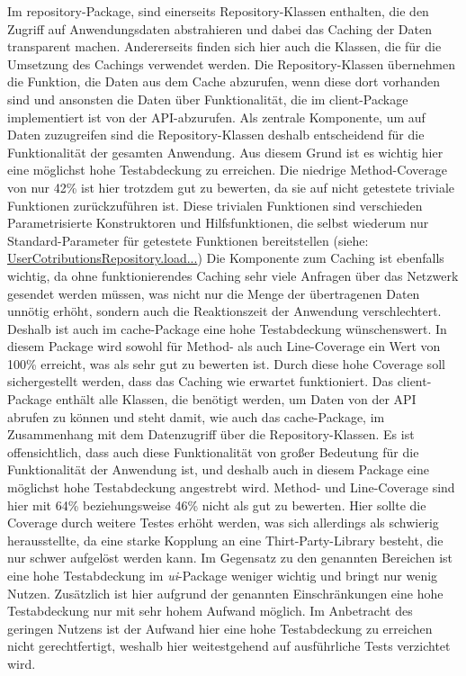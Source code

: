 \documentclass[12pt]{article}
\begin{document}
\newline
\newline
Im repository-Package, sind einerseits Repository-Klassen enthalten, die den Zugriff auf Anwendungsdaten abstrahieren und dabei das Caching der Daten transparent machen.
Andererseits finden sich hier auch die Klassen, die für die Umsetzung des Cachings verwendet werden.
Die Repository-Klassen übernehmen die Funktion, die Daten aus dem Cache abzurufen, wenn diese dort vorhanden sind und ansonsten die Daten über Funktionalität, die im client-Package implementiert ist von der API-abzurufen.
Als zentrale Komponente, um auf Daten zuzugreifen sind die Repository-Klassen deshalb  entscheidend für die Funktionalität der gesamten Anwendung.
Aus diesem Grund ist es wichtig hier eine möglichst hohe Testabdeckung zu erreichen.
Die niedrige Method-Coverage von nur 42\% ist hier trotzdem gut zu bewerten, da sie auf nicht getestete triviale Funktionen zurückzuführen ist.
Diese trivialen Funktionen sind verschieden Parametrisierte Konstruktoren und Hilfsfunktionen, die selbst wiederum nur Standard-Parameter für getestete Funktionen bereitstellen (siehe: \href{https://github.com/lukaspanni/OpenSourceStats/blob/ac3c4098d8f89f5eed7142d675ca49c4d3dd724f/app/src/main/java/de/lukaspanni/opensourcestats/repository/UserContributionsRepository.java#L51-L65}{UserCotributionsRepository.load...})
\newline
Die Komponente zum Caching ist ebenfalls wichtig, da ohne funktionierendes Caching sehr viele Anfragen über das Netzwerk gesendet werden müssen, was nicht nur die Menge der übertragenen Daten unnötig erhöht, sondern auch die Reaktionszeit der Anwendung verschlechtert.
Deshalb ist  auch im cache-Package eine hohe Testabdeckung wünschenswert.
In diesem Package wird sowohl für Method- als auch Line-Coverage ein Wert von 100\% erreicht, was als sehr gut zu bewerten ist.
Durch diese hohe Coverage soll sichergestellt werden, dass das Caching wie erwartet funktioniert.
\newline
\newline
Das client-Package enthält alle Klassen, die benötigt werden, um Daten von der API abrufen zu können und steht damit, wie auch das cache-Package, im Zusammenhang mit dem Datenzugriff über die Repository-Klassen.
Es ist offensichtlich, dass auch diese Funktionalität von großer Bedeutung für die Funktionalität der Anwendung ist, und deshalb auch in diesem Package eine möglichst hohe Testabdeckung angestrebt wird.
Method- und Line-Coverage sind hier mit 64\% beziehungsweise 46\% nicht als gut zu bewerten. Hier sollte die Coverage durch weitere Testes erhöht werden, was sich allerdings als schwierig herausstellte, da eine starke Kopplung an eine Thirt-Party-Library besteht, die nur schwer aufgelöst werden kann.
\newline
\newline
Im Gegensatz zu den genannten Bereichen ist eine hohe Testabdeckung im \textit{ui}-Package weniger wichtig und bringt nur wenig Nutzen. 
Zusätzlich ist hier aufgrund der genannten Einschränkungen eine hohe Testabdeckung nur mit sehr hohem Aufwand möglich.
Im Anbetracht des geringen Nutzens ist der Aufwand hier eine hohe Testabdeckung zu erreichen nicht gerechtfertigt, weshalb hier weitestgehend auf ausführliche Tests verzichtet wird.
\end{document}
